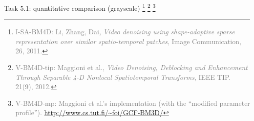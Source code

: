 \documentclass[mathserif, 8pt]{beamer}
\begin{document}
\begin{frame}{Task 5.1: quantitative comparison (grayscale)}
	\let\thefootnote\relax\footnote[frame]{\textcolor{gray}{I-SA-BM4D: Li,
		Zhang, Dai, \emph{Video denoising using shape-adaptive sparse
		representation over similar spatio-temporal patches},
		Image Communication, 26, 2011.}}
	\let\thefootnote\relax\footnote[frame]{\textcolor{gray}{V-BM4D-tip: Maggioni
		et al., \emph{Video Denoising, Deblocking and Enhancement Through
		Separable 4-D Nonlocal Spatiotemporal Transforms}, IEEE TIP. 21(9),
		2012.}}
	\let\thefootnote\relax\footnote[frame]{\textcolor{gray}{V-BM4D-mp: Maggioni
		et al.'s implementation (with the ``modified parameter profile'').
		\url{http://www.cs.tut.fi/~foi/GCF-BM3D/}}}
\end{frame}



\end{document}
